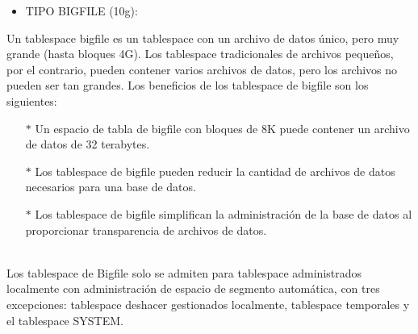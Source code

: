 \begin{itemize}
	\item TIPO BIGFILE (10g):
\end{itemize}
\begin{adjustwidth}{0.40in}{0.0in}
	Un tablespace bigfile es un tablespace con un archivo de datos único, pero muy grande (hasta bloques 4G). Los tablespace tradicionales de archivos pequeños, por el contrario, pueden contener varios archivos de datos, pero los archivos no pueden ser tan grandes. Los beneficios de los tablespace de bigfile son los siguientes:
	\begin{itemize}
		\item[$*$] Un espacio de tabla de bigfile con bloques de 8K puede contener un archivo de datos de 32 terabytes. 
		\item[$*$] Los tablespace de bigfile pueden reducir la cantidad de archivos de datos necesarios para una base de datos. 
		\item[$*$] Los tablespace de bigfile simplifican la administración de la base de datos al proporcionar transparencia de archivos de datos. \\
\\
	\end{itemize}
	Los tablespace de Bigfile solo se admiten para tablespace administrados localmente con administración de espacio de segmento automática, con tres excepciones: tablespace deshacer gestionados localmente, tablespace temporales y el tablespace SYSTEM.		
\end{adjustwidth}

